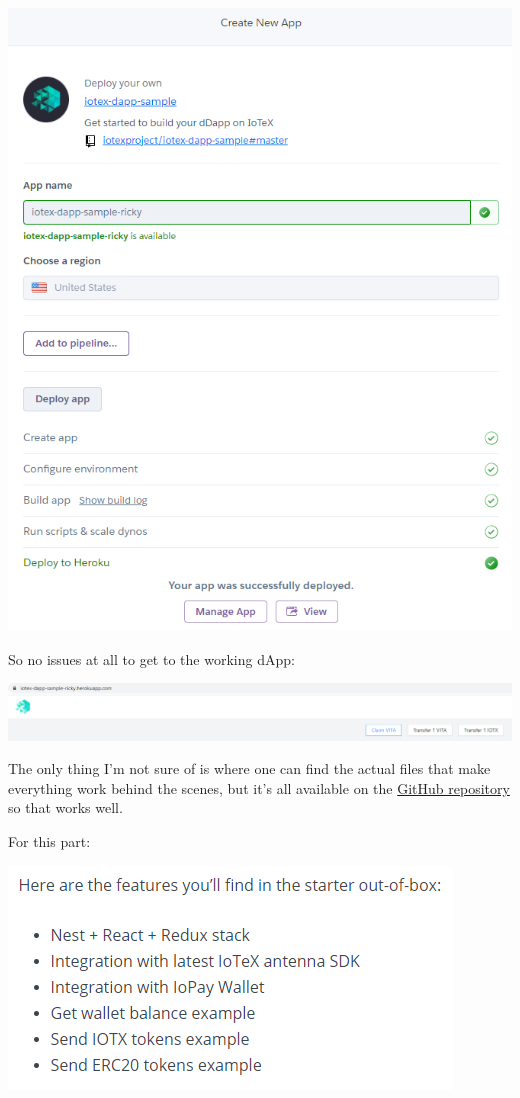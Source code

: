 \documentclass[
]{book}
\begin{document}
\includegraphics{images/heroku_deploy.PNG}

So no issues at all to get to the working dApp:

\includegraphics{images/heroku_app.PNG}

The only thing I'm not sure of is where one can find the actual files
that make everything work behind the scenes, but it's all available on
the \href{https://github.com/iotexproject/iotex-dapp-sample}{GitHub
repository} so that works well.

For this part:

\includegraphics{images/dapp_starter_features.PNG}
\end{document}
